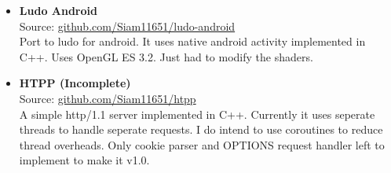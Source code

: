 \begin{itemize}
{    A simple cross-platform implementation to ludo for desktop using OpenGL 4.6.
  }
  \item {
    \textbf{Ludo Android} \\
    Source: \href{https://github.com/Siam11651/ludo-android}{github.com/Siam11651/ludo-android} \\
    Port to ludo for android. It uses native android activity implemented in C++. Uses OpenGL ES 3.2. Just had to modify the shaders.
  }
  \item {
    \textbf{HTPP (Incomplete)} \\
    Source: \href{https://github.com/Siam11651/htpp}{github.com/Siam11651/htpp} \\
    A simple http/1.1 server implemented in C++. Currently it uses seperate threads to handle seperate requests. I do intend to use coroutines to reduce thread overheads. Only cookie parser and OPTIONS request handler left to implement to make it v1.0.
  }
\end{itemize}